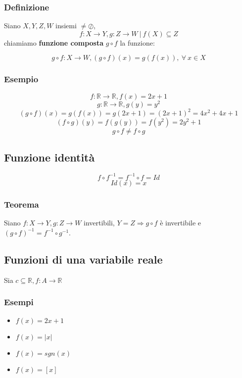     \subsubsection*{Definizione}
        Siano $X,Y,Z,W$ insiemi $\neq \oslash$,
        \[f:X \rightarrow Y, g:Z\rightarrow W\ |\ f(X) \subseteq Z\]
        chiamiamo \textbf{funzione composta} $g \circ f$ la funzione:
        \begin{Large}
        \[
            g \circ f: X \rightarrow W, (g \circ f)(x) = g(f(x)),\ \forall\ x \in X 
        \]
        \end{Large}
\subsubsection*{Esempio}
    \begin{Large}
        \[
            f : \mathbb{R} \rightarrow \mathbb{R}, f(x) = 2x + 1
        \]
        \[
            g : \mathbb{R} \rightarrow \mathbb{R}, g(y) = y^{2}
        \]
        \[
            (g \circ f)(x) = g(f(x)) = g(2x + 1) = {(2x + 1)}^{2} = 4x^{2} + 4x +1    
        \]
        \[
            (f \circ g)(y) = f(g(y)) = f(y^{2}) = 2y^{2} + 1
        \]
        \[
            g \circ f \neq f \circ g    
        \]
    \end{Large}
\subsection{Funzione identità}
    \begin{Large}
        \[
            f \circ f^{-1} = f^{-1} \circ f = Id    
        \]
        \[
            Id(x) = x    
        \]
    \end{Large}
    \subsubsection*{Teorema}
        Siano $f: X \rightarrow Y, g: Z \rightarrow W$ invertibili, $Y = Z \Rightarrow g \circ f$ è invertibile 
        e ${(g \circ f)}^{-1} = f^{-1} \circ g^{-1}$.

\subsection{Funzioni di una variabile reale}
    Sia $c \subseteq \mathbb{R}, f:A \rightarrow \mathbb{R}$
    \subsubsection*{Esempi}
        \begin{itemize}
            \item $f(x) = 2x + 1$
            \item $f(x) = |x|$
            \item $f(x) = sgn(x)$
            \item $f(x) = [x]$
        \end{itemize}
